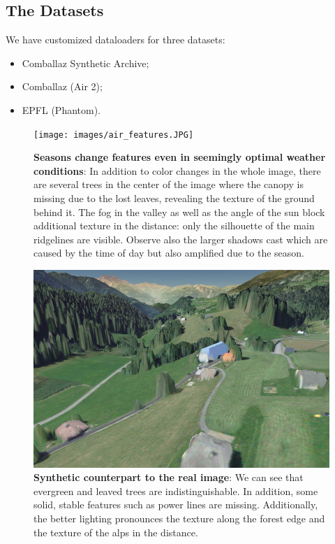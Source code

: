 \documentclass[10pt,conference,compsocconf]{IEEEtran}
\begin{document}
\subsection{The Datasets}
We have customized dataloaders for three datasets:
\begin{itemize}
    \item Comballaz Synthetic Archive;
    \item Comballaz (Air 2);
    \item EPFL (Phantom).
\end{itemize}
\begin{figure}[hbpt]
\scriptsize
\texttt{[image: images/air\_features.JPG]}
\caption{\textbf{Seasons change features even in seemingly optimal weather conditions}: In addition to color changes in the whole image, there are several trees in the center of the image where the canopy is missing due to the lost leaves, revealing the texture of the ground behind it. The fog in the valley as well as the angle of the sun block additional texture in the distance: only the silhouette of the main ridgelines are visible. Observe also the larger shadows cast which are caused by the time of day but also amplified due to the season.}
\label{fig:real_seasons}
\end{figure}
\begin{figure}[hbpt]
\scriptsize
\includegraphics[width=\linewidth]{images/air2_synth.png}
\caption{\textbf{Synthetic counterpart to the real image}: We can see that evergreen and leaved trees are indistinguishable. In addition, some solid, stable features such as power lines are missing. Additionally, the better lighting pronounces the texture along the forest edge and the texture of the alps in the distance.}
\label{fig:fake_seasons}
\end{figure}
\end{document}
